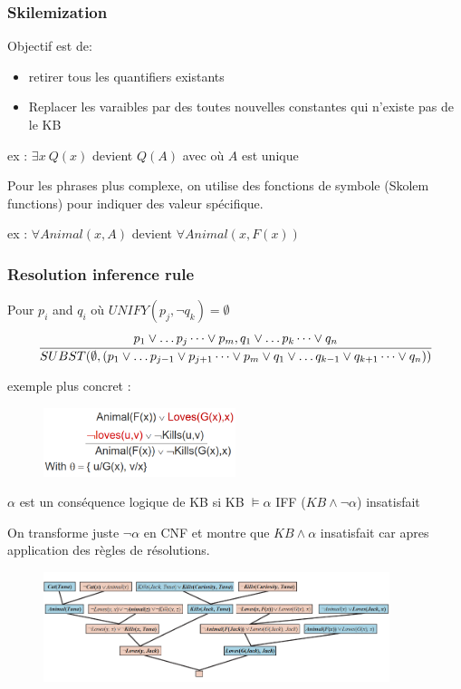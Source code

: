 		\subsubsection{Skilemization}
			Objectif est de:
			\begin{itemize}
				\item retirer tous les quantifiers existants
				\item Replacer les varaibles par des toutes nouvelles constantes qui n'existe pas de le KB
			\end{itemize}			 
			
			ex : $\exists x \ Q(x)$ devient $Q(A)$ avec où $A$ est unique
			
			Pour les phrases plus complexe, on utilise des fonctions de symbole (Skolem functions) pour indiquer des valeur  spécifique.
			
			ex : $\forall Animal(x,A)$ devient $\forall Animal(x,F(x))$
			
		\subsubsection{Resolution inference rule}
			Pour $p_i$ and $q_i$ où $UNIFY(p_j, \neg q_k) = \emptyset$
			\begin{equation}
				\cfrac{p_1 \lor \dots p_j \dots \lor p_m, q_1 \lor \dots p_k \dots \lor q_n}{SUBST(\emptyset,(p_1 \lor \dots p_{j-1} \lor p_{j+1} \dots \lor p_m \lor q_1 \lor \dots q_{k-1} \lor q_{k+1} \dots \lor q_n))}
			\end{equation}
			
			exemple plus concret :
			
			\begin{figure}[htp]	
				\centering
				\includegraphics[width=0.5\textwidth]{img/RIR.png}
			\end{figure}	
			
			$\alpha$ est un conséquence logique de KB si KB $\models \alpha$ IFF ($KB \land \neg \alpha$) insatisfait
			
			On transforme juste $\neg \alpha$ en CNF et montre que $KB \land \alpha$ insatisfait car apres application des règles de résolutions.
			
			\begin{figure}[htp]	
				\centering
				\includegraphics[width=0.9\textwidth]{img/RIR1.png}
			\end{figure}
			
